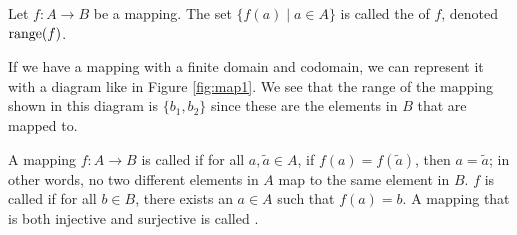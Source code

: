 \begin{defn}
Let $ f:A\to B $ be a mapping. The set $ \{f(a)\mid a\in A\} $ is called the  of $ f $, denoted $ \operatorname{range}(f) $.
\end{defn}

\begin{SCfigure}[0.8][hb]
\centering
{}
\caption{An example of a mapping from $ A=\{a_1,a_2,a_3\} $ to $ B=\{b_1,b_2,b_3\} $}
\label{fig:map1}
\end{SCfigure}

If we have a mapping with a finite domain and codomain, we can represent it with a diagram like in Figure \ref{fig:map1}. We see that the range of the mapping shown in this diagram is $ \{b_1,b_2\} $ since these are the elements in $ B $ that are mapped to.

\begin{defn}
A mapping $ f:A\to B $ is called  if for all $ a,\tilde{a}\in A $, if $ f(a)=f(\tilde{a}) $, then $ a=\tilde{a} $; in other words, no two different elements in $ A $ map to the same element in $ B $. $ f $ is called  if for all $ b\in B $, there exists an $ a\in A $ such that $ f(a)=b $. A mapping that is both injective and surjective is called .
\end{defn}

\begin{SCfigure}[0.8][ht]
\centering
{}
\caption{An example of a bijective mapping from $ A=\{a_1,a_2,a_3\} $ to $ B=\{b_1,b_2,b_3\} $}
\end{SCfigure}

